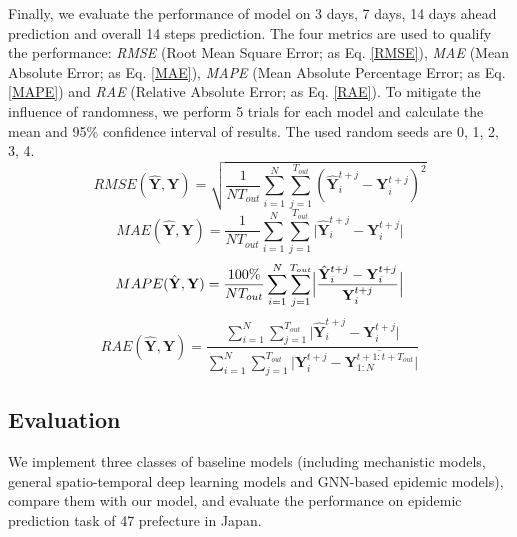 \documentclass[lettersize,journal]{IEEEtran}
\begin{document}
Finally, we evaluate the performance of model on 3 days, 7 days, 14 days ahead prediction and overall 14 steps prediction. The four metrics are used to qualify the performance: \textit{RMSE} (Root Mean Square Error; as Eq. \ref{RMSE}), \textit{MAE} (Mean Absolute Error; as Eq. \ref{MAE}), \textit{MAPE} (Mean Absolute Percentage Error; as Eq. \ref{MAPE}) and \textit{RAE} (Relative Absolute Error; as Eq. \ref{RAE}). To mitigate the influence of randomness, we perform 5 trials for each model and calculate the mean and 95\% confidence interval of results. The used random seeds are 0, 1, 2, 3, 4. 
\begin{equation}\label{RMSE}
    RMSE(\hat{\mathbf Y},\mathbf Y) = \sqrt{\frac{1}{NT_{out}}\sum_{i=1}^{N}\sum_{j=1}^{T_{out}} (\hat{\mathbf Y}_i^{t+j} - \mathbf Y_i^{t+j})^2}
\end{equation}
\begin{equation}\label{MAE}
    MAE(\hat{\mathbf Y},\mathbf Y) = \frac{1}{NT_{out}}\sum_{i=1}^{N}\sum_{j=1}^{T_{out}}\lvert \hat{\mathbf Y}_i^{t+j} - \mathbf Y_i^{t+j} \rvert
\end{equation}
\begin{equation}\label{MAPE}
    MAPE(\hat{\mathbf Y},\mathbf Y) = \frac{100\%}{NT_{out}}\sum_{i=1}^{N}\sum_{j=1}^{T_{out}}\Bigl| \frac{\hat{\mathbf Y}_i^{t+j} - \mathbf Y_i^{t+j}}{\mathbf Y_i^{t+j}}\Bigr|
\end{equation}
\begin{equation}\label{RAE}
    RAE(\hat{\mathbf Y},\mathbf Y) = \frac{\sum_{i=1}^{N}\sum_{j=1}^{T_{out}}\lvert \hat{\mathbf Y}_i^{t+j} - \mathbf Y_i^{t+j}\rvert}  {{\sum_{i=1}^{N}\sum_{j=1}^{T_{out}}\lvert \mathbf Y_i^{t+j} - \overline{\mathbf Y_{1:N}^{t+1:t+T_{out}}}}\rvert} 
\end{equation}


\subsection{Evaluation}
We implement three classes of baseline models (including mechanistic models, general spatio-temporal deep learning models and GNN-based epidemic models), compare them with our model, and evaluate the performance on epidemic prediction task of 47 prefecture in Japan.
\end{document}
